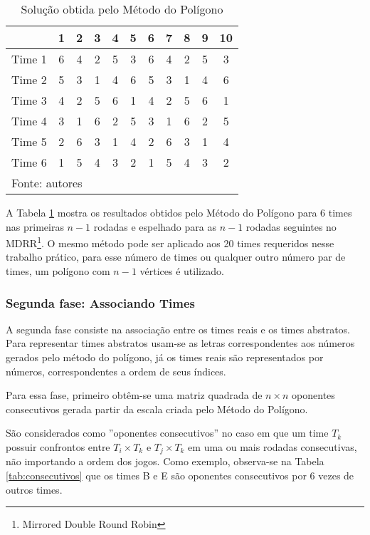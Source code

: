 \documentclass[12pt,a4paper]{article}
\renewcommand*{\arraystretch}{1.2}
\numberwithin{figure}{section}
\numberwithin{table}{section}
\begin{document}
\begin{table}[H]
	\renewcommand{\arraystretch}{1}
	\centering
	\caption{Solução obtida pelo Método do Polígono}
	\label{tab:poligono}
	\begin{tabular}{l*{10}{c}}
		\toprule
		& 1 & 2 & 3 & 4 & 5 & 6 & 7 & 8 & 9 & 10 \\
		\midrule
		Time 1 & 6 & 4 & 2 & 5 & 3 & 6 & 4 & 2 & 5 & 3 \\
		Time 2 & 5 & 3 & 1 & 4 & 6 & 5 & 3 & 1 & 4 & 6 \\
		Time 3 & 4 & 2 & 5 & 6 & 1 & 4 & 2 & 5 & 6 & 1 \\
		Time 4 & 3 & 1 & 6 & 2 & 5 & 3 & 1 & 6 & 2 & 5 \\
		Time 5 & 2 & 6 & 3 & 1 & 4 & 2 & 6 & 3 & 1 & 4 \\
		Time 6 & 1 & 5 & 4 & 3 & 2 & 1 & 5 & 4 & 3 & 2 \\
		\bottomrule
		\multicolumn{11}{l}{\footnotesize Fonte: autores}
	\end{tabular}
\end{table}

A Tabela \ref{tab:poligono} mostra os resultados obtidos pelo Método do Polígono para $6$ times nas primeiras $n-1$ rodadas e espelhado para as $n-1$ rodadas seguintes no MDRR\footnote{Mirrored Double Round Robin}. O mesmo método pode ser aplicado aos 20 times requeridos nesse trabalho prático, para esse número de times ou qualquer outro número par de times, um polígono com $n-1$ vértices é utilizado.

\subsubsection{Segunda fase: Associando Times}

A segunda fase consiste na associação entre os times reais e os times abstratos. Para representar times abstratos usam-se as letras correspondentes aos números gerados pelo método do polígono, já os times reais são representados por números, correspondentes a ordem de seus índices.

Para essa fase, primeiro obtêm-se uma matriz quadrada de $n \times n$ oponentes consecutivos gerada partir da escala criada pelo Método do Polígono.

São considerados como ''oponentes consecutivos'' no caso em que um time $T_{k}$ possuir confrontos entre $T_{i} \times T_{k}$ e $T_{j} \times T_{k}$ em uma ou mais rodadas consecutivas, não importando a ordem dos jogos. Como exemplo, observa-se na Tabela \ref{tab:consecutivos} que os times B e E são oponentes consecutivos por 6 vezes de outros times.
\end{document}
